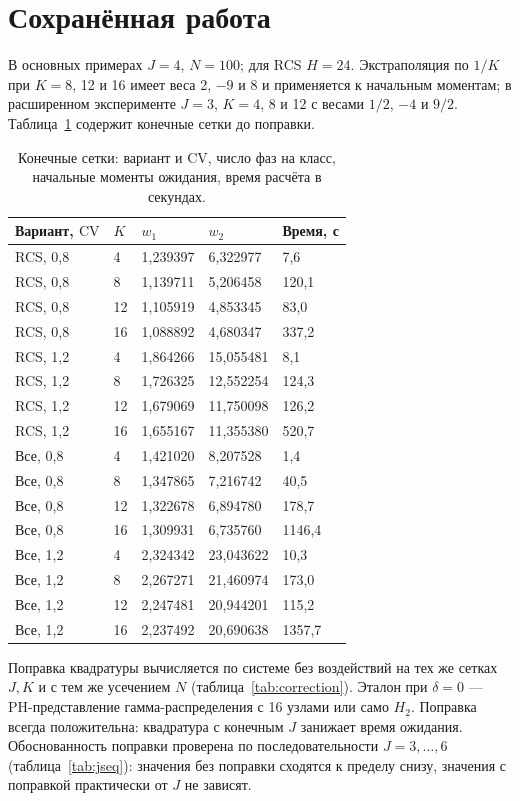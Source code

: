 \documentclass[a4paper,12pt]{article}
\begin{document}
\section{Сохранённая работа}
В основных примерах \(J=4\), \(N=100\); для RCS \(H=24\). Экстраполяция по \(1/K\) при \(K=8\), 12 и 16 имеет веса 2, \(-9\) и 8 и применяется к начальным моментам; в расширенном эксперименте \(J=3\), \(K=4\), 8 и 12 с весами \(1/2\), \(-4\) и \(9/2\). Таблица~\ref{tab:grids} содержит конечные сетки до поправки.

\begin{table}[!htbp]
\centering\small\setlength{\tabcolsep}{2pt}
\begin{tabular}{@{}p{4.44cm}p{1.13cm}p{3.31cm}p{3.31cm}p{2.46cm}@{}}
\toprule
Вариант, $\mathrm{CV}$ & $K$ & $w_1$ & $w_2$ & Время, с \\
\midrule
RCS, 0,8 & 4 & 1,239397 & 6,322977 & 7,6 \\
RCS, 0,8 & 8 & 1,139711 & 5,206458 & 120,1 \\
RCS, 0,8 & 12 & 1,105919 & 4,853345 & 83,0 \\
RCS, 0,8 & 16 & 1,088892 & 4,680347 & 337,2 \\
RCS, 1,2 & 4 & 1,864266 & 15,055481 & 8,1 \\
RCS, 1,2 & 8 & 1,726325 & 12,552254 & 124,3 \\
RCS, 1,2 & 12 & 1,679069 & 11,750098 & 126,2 \\
RCS, 1,2 & 16 & 1,655167 & 11,355380 & 520,7 \\
Все, 0,8 & 4 & 1,421020 & 8,207528 & 1,4 \\
Все, 0,8 & 8 & 1,347865 & 7,216742 & 40,5 \\
Все, 0,8 & 12 & 1,322678 & 6,894780 & 178,7 \\
Все, 0,8 & 16 & 1,309931 & 6,735760 & 1146,4 \\
Все, 1,2 & 4 & 2,324342 & 23,043622 & 10,3 \\
Все, 1,2 & 8 & 2,267271 & 21,460974 & 173,0 \\
Все, 1,2 & 12 & 2,247481 & 20,944201 & 115,2 \\
Все, 1,2 & 16 & 2,237492 & 20,690638 & 1357,7 \\
\bottomrule
\end{tabular}
\caption{Конечные сетки: вариант и \(\mathrm{CV}\), число фаз на класс, начальные моменты ожидания, время расчёта в секундах.}
\label{tab:grids}
\end{table}

Поправка квадратуры вычисляется по системе без воздействий на тех же сетках \(J,K\) и с тем же усечением \(N\) (таблица~\ref{tab:correction}). Эталон при \(\delta=0\) --- PH-представление гамма-распределения с 16 узлами или само \(H_2\). Поправка всегда положительна: квадратура с конечным \(J\) занижает время ожидания. Обоснованность поправки проверена по последовательности \(J=3,\ldots,6\) (таблица~\ref{tab:jseq}): значения без поправки сходятся к пределу снизу, значения с поправкой практически от \(J\) не зависят.
\end{document}
